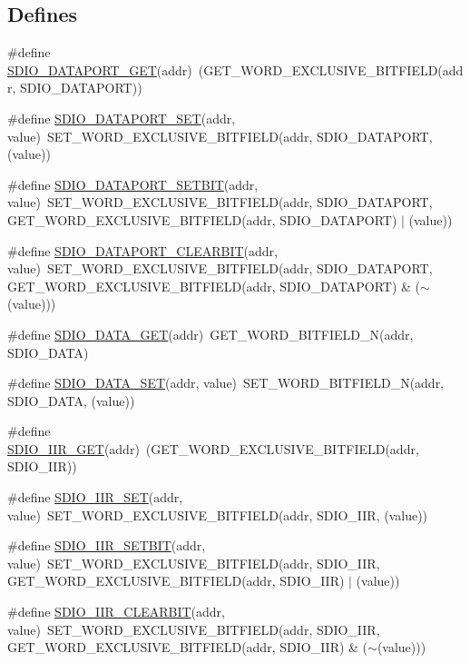\subsection*{Defines}
\begin{DoxyCompactItemize}
\item 
\#define \hyperlink{a00570_a8160167e3cac1c6dc7696082fde775eb}{SDIO\_\-DATAPORT\_\-GET}(addr)~(GET\_\-WORD\_\-EXCLUSIVE\_\-BITFIELD(addr, SDIO\_\-DATAPORT))
\item 
\#define \hyperlink{a00570_ac78e83c0862393d1e7ceb26f42ef3182}{SDIO\_\-DATAPORT\_\-SET}(addr, value)~SET\_\-WORD\_\-EXCLUSIVE\_\-BITFIELD(addr, SDIO\_\-DATAPORT, (value))
\item 
\#define \hyperlink{a00570_a1e7eea4f269affd976008a4ec67f47eb}{SDIO\_\-DATAPORT\_\-SETBIT}(addr, value)~SET\_\-WORD\_\-EXCLUSIVE\_\-BITFIELD(addr, SDIO\_\-DATAPORT, GET\_\-WORD\_\-EXCLUSIVE\_\-BITFIELD(addr, SDIO\_\-DATAPORT) $|$ (value))
\item 
\#define \hyperlink{a00570_a30ff7fa57be218c166f101c85013020a}{SDIO\_\-DATAPORT\_\-CLEARBIT}(addr, value)~SET\_\-WORD\_\-EXCLUSIVE\_\-BITFIELD(addr, SDIO\_\-DATAPORT, GET\_\-WORD\_\-EXCLUSIVE\_\-BITFIELD(addr, SDIO\_\-DATAPORT) \& ($\sim$(value)))
\item 
\#define \hyperlink{a00570_ac0fef7a5ca6b165fa6c046b219b0efeb}{SDIO\_\-DATA\_\-GET}(addr)~GET\_\-WORD\_\-BITFIELD\_\-N(addr, SDIO\_\-DATA)
\item 
\#define \hyperlink{a00570_a8bf738b6ed1b69f0b14fa2c4a901722a}{SDIO\_\-DATA\_\-SET}(addr, value)~SET\_\-WORD\_\-BITFIELD\_\-N(addr, SDIO\_\-DATA, (value))
\item 
\#define \hyperlink{a00570_aca671e0d223bea7ba401d40b692150cf}{SDIO\_\-IIR\_\-GET}(addr)~(GET\_\-WORD\_\-EXCLUSIVE\_\-BITFIELD(addr, SDIO\_\-IIR))
\item 
\#define \hyperlink{a00570_a1bd3a35a67412524fcd8ba3bff5c08a0}{SDIO\_\-IIR\_\-SET}(addr, value)~SET\_\-WORD\_\-EXCLUSIVE\_\-BITFIELD(addr, SDIO\_\-IIR, (value))
\item 
\#define \hyperlink{a00570_a234124a15e97857969acdb69ef6c35b6}{SDIO\_\-IIR\_\-SETBIT}(addr, value)~SET\_\-WORD\_\-EXCLUSIVE\_\-BITFIELD(addr, SDIO\_\-IIR, GET\_\-WORD\_\-EXCLUSIVE\_\-BITFIELD(addr, SDIO\_\-IIR) $|$ (value))
\item 
\#define \hyperlink{a00570_a69d7e6cc274370f68a9da4dc7fe9f74e}{SDIO\_\-IIR\_\-CLEARBIT}(addr, value)~SET\_\-WORD\_\-EXCLUSIVE\_\-BITFIELD(addr, SDIO\_\-IIR, GET\_\-WORD\_\-EXCLUSIVE\_\-BITFIELD(addr, SDIO\_\-IIR) \& ($\sim$(value)))
\item 

\end{DoxyCompactItemize}
